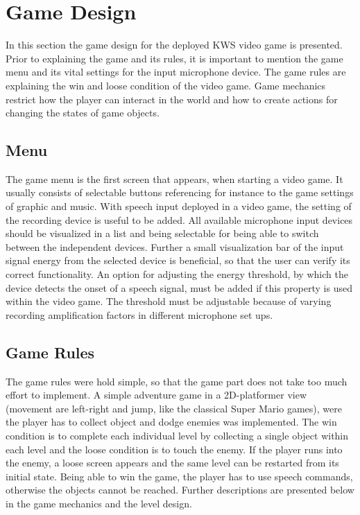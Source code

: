 
\section{Game Design}\label{sec:game_design}
\thesisStateNotReady
In this section the game design for the deployed KWS video game is presented.
Prior to explaining the game and its rules, it is important to mention the game menu and its vital settings for the input microphone device.
The game rules are explaining the win and loose condition of the video game.
Game mechanics restrict how the player can interact in the world and how to create actions for changing the states of game objects.


\subsection{Menu}\label{sec:game_design_menu}
The game menu is the first screen that appears, when starting a video game. 
It usually consists of selectable buttons referencing for instance to the game settings of graphic and music.
With speech input deployed in a video game, the setting of the recording device is useful to be added.
All available microphone input devices should be visualized in a list and being selectable for being able to switch between the independent devices.
Further a small visualization bar of the input signal energy from the selected device is beneficial, so that the user can verify its correct functionality.
An option for adjusting the energy threshold, by which the device detects the onset of a speech signal, must be added if this property is used within the video game.
The threshold must be adjustable because of varying recording amplification factors in different microphone set ups.



\subsection{Game Rules}\label{sec:game_design_rules}
The game rules were hold simple, so that the game part does not take too much effort to implement.
A simple adventure game in a 2D-platformer view (movement are left-right and jump, like the classical Super Mario games), were the player has to collect object and dodge enemies was implemented.
The win condition is to complete each individual level by collecting a single object within each level and the loose condition is to touch the enemy.
If the player runs into the enemy, a loose screen appears and the same level can be restarted from its initial state.
Being able to win the game, the player has to use speech commands, otherwise the objects cannot be reached.
Further descriptions are presented below in the game mechanics and the level design.


